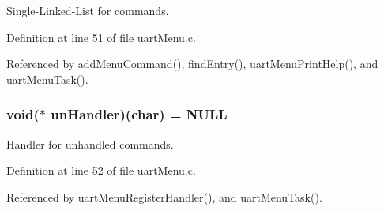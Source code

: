 Single-\/\-Linked-\/\-List for commands. 



Definition at line 51 of file uart\-Menu.\-c.



Referenced by add\-Menu\-Command(), find\-Entry(), uart\-Menu\-Print\-Help(), and uart\-Menu\-Task().

\hypertarget{group__uartmenu_ga59944eadba9321ee37f247a13bc8ec1a}{
\subsubsection[{un\-Handler}]{\setlength{\rightskip}{0pt plus 5cm}void($\ast$ un\-Handler)(char) = N\-U\-L\-L}}\label{group__uartmenu_ga59944eadba9321ee37f247a13bc8ec1a}


Handler for unhandled commands. 



Definition at line 52 of file uart\-Menu.\-c.



Referenced by uart\-Menu\-Register\-Handler(), and uart\-Menu\-Task().

